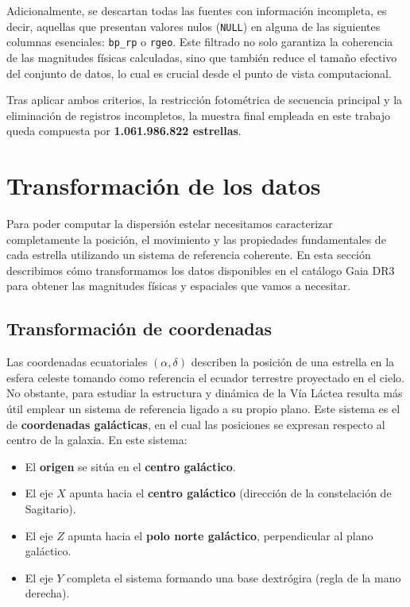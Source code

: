 Adicionalmente, se descartan todas las fuentes con información incompleta, es decir, aquellas que presentan valores nulos (\texttt{NULL}) en alguna de las siguientes columnas esenciales:
\texttt{bp\_rp} o \texttt{rgeo}.
Este filtrado no solo garantiza la coherencia de las magnitudes físicas calculadas, sino que también reduce el tamaño efectivo del conjunto de datos, lo cual es crucial desde el punto de vista computacional.

Tras aplicar ambos criterios, la restricción fotométrica de secuencia principal y la eliminación de registros incompletos, la muestra final empleada en este trabajo queda compuesta por \textbf{1.061.986.822 estrellas}.

\section{Transformación de los datos}\label{sec:calculos_previos}

Para poder computar la dispersión estelar necesitamos caracterizar completamente la posición, el movimiento y las propiedades fundamentales de cada estrella utilizando un sistema de referencia coherente.
En esta sección describimos cómo transformamos los datos disponibles en el catálogo Gaia DR3 para obtener las magnitudes físicas y espaciales que vamos a necesitar.

\subsection{Transformación de coordenadas}\label{subsec:transformacion-de-coordenadas}

Las coordenadas ecuatoriales $(\alpha, \delta)$ describen la posición de una estrella en la esfera celeste tomando como referencia el ecuador terrestre proyectado en el cielo.
No obstante, para estudiar la estructura y dinámica de la Vía Láctea resulta más útil emplear un sistema de referencia ligado a su propio plano.
Este sistema es el de \textbf{coordenadas galácticas}, en el cual las posiciones se expresan respecto al centro de la galaxia.
En este sistema:
\begin{itemize}
    \item El \textbf{origen} se sitúa en el \textbf{centro galáctico}.
    \item El eje $X$ apunta hacia el \textbf{centro galáctico} (dirección de la constelación de Sagitario).
    \item El eje $Z$ apunta hacia el \textbf{polo norte galáctico}, perpendicular al plano galáctico.
    \item El eje $Y$ completa el sistema formando una base dextrógira (regla de la mano derecha).
\end{itemize}

